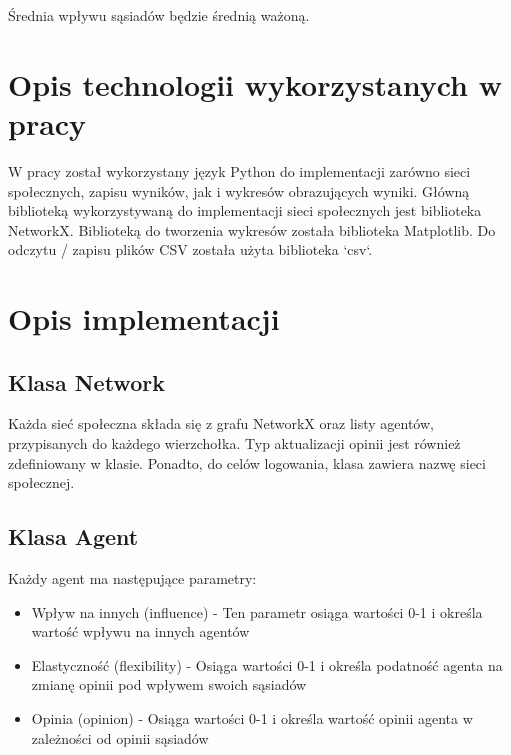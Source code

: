 \documentclass{wfiisul}
\begin{document}
Średnia wpływu sąsiadów będzie średnią ważoną.


\chapter{Opis technologii wykorzystanych w pracy}

W pracy został wykorzystany język Python do implementacji zarówno sieci społecznych, zapisu wyników, jak i wykresów obrazujących wyniki.
Główną biblioteką wykorzystywaną do implementacji sieci społecznych jest biblioteka NetworkX.
Biblioteką do tworzenia wykresów została biblioteka Matplotlib.
Do odczytu / zapisu plików CSV została użyta biblioteka `csv`.


\chapter{Opis implementacji}

\section{Klasa Network}

Każda sieć społeczna składa się z grafu NetworkX oraz listy agentów, przypisanych do każdego wierzchołka.
Typ aktualizacji opinii jest również zdefiniowany w klasie.
Ponadto, do celów logowania, klasa zawiera nazwę sieci społecznej.

\section{Klasa Agent}

Każdy agent ma następujące parametry:
\begin{itemize}
  \item Wpływ na innych (influence) - Ten parametr osiąga wartości 0-1 i określa wartość wpływu na innych agentów
  \item Elastyczność (flexibility) - Osiąga wartości 0-1 i określa podatność agenta na zmianę opinii pod wpływem swoich sąsiadów
  \item Opinia (opinion) - Osiąga wartości 0-1 i określa wartość opinii agenta w zależności od opinii sąsiadów
\end{itemize}
\end{document}
